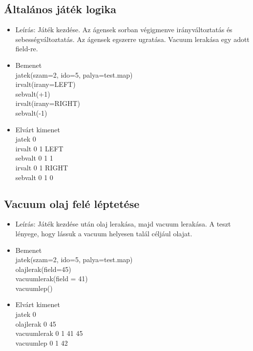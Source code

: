 \subsection{Általános játék logika}
\begin{itemize}
	\item Leírás: Játék kezdése. Az ágensek sorban végigmenve irányváltoztatás és sebességváltoztatás. Az ágensek egszerre ugratása. Vacuum lerakása egy adott field-re.
	\item Bemenet\\
		jatek(szam=2, ido=5, palya=test.map) \\
		irvalt(irany=LEFT) \\
		sebvalt(+1) \\
		irvalt(irany=RIGHT) \\
		sebvalt(-1) \\
	\item Elvárt kimenet\\
		jatek 0 \\ 
		irvalt 0 1 LEFT \\ 
		sebvalt 0 1 1 \\ 
		irvalt 0 1 RIGHT \\ 
		sebvalt 0 1 0	\\ 
\end{itemize}

\subsection{Vacuum olaj felé léptetése}
\begin{itemize}
	\item Leírás: Játék kezdése után olaj lerakása, majd vacuum lerakása. A teszt lényege, hogy lássuk a vacuum helyesen talál céljául olajat.
	\item Bemenet\\
		jatek(szam=2, ido=5, palya=test.map) \\
		olajlerak(field=45) \\
		vacuumlerak(field = 41) \\
		vacuumlep() \\
	\item Elvárt kimenet\\
		jatek 0 \\
		olajlerak 0 45 \\
		vacuumlerak 0 1 41 45 \\
		vacuumlep 0 1 42 \\ 
\end{itemize}

